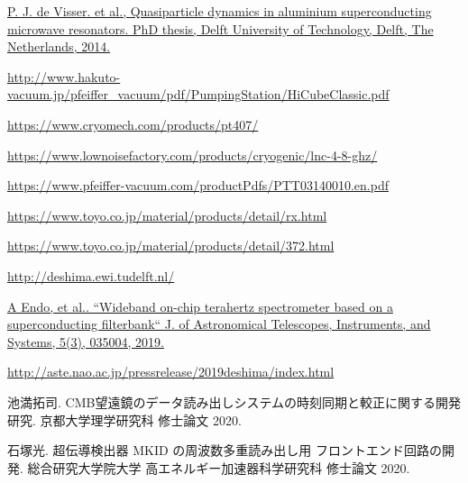 \begin{thebibliography}{99}
\href{https://doi.org/10.4233/uuid:eae4c9fc-f90d-4c12-a878-8428ee4adb4c}{
P. J. de Visser. et al., Quasiparticle dynamics in aluminium superconducting microwave resonators. PhD thesis, Delft University of Technology, Delft, The Netherlands, 2014. 
}


\href{http://www.hakuto-vacuum.jp/pfeiffer\_vacuum/pdf/PumpingStation/HiCubeClassic.pdf}{
http://www.hakuto-vacuum.jp/pfeiffer\_vacuum/pdf/PumpingStation/HiCubeClassic.pdf}

\href{https://www.cryomech.com/products/pt407/}{
https://www.cryomech.com/products/pt407/}

\href{https://www.lownoisefactory.com/products/cryogenic/lnc-4-8-ghz/}{
https://www.lownoisefactory.com/products/cryogenic/lnc-4-8-ghz/}

\href{https://www.pfeiffer-vacuum.com/productPdfs/PTT03140010.en.pdf}{
https://www.pfeiffer-vacuum.com/productPdfs/PTT03140010.en.pdf  
}

\href{https://www.toyo.co.jp/material/products/detail/rx.html}{
https://www.toyo.co.jp/material/products/detail/rx.html
}

\href{https://www.toyo.co.jp/material/products/detail/372.html}{
https://www.toyo.co.jp/material/products/detail/372.html
}

\href{http://deshima.ewi.tudelft.nl/}{
  http://deshima.ewi.tudelft.nl/
}

\href{https://www.spiedigitallibrary.org/journals/Journal-of-Astronomical-Telescopes-Instruments-and-Systems/volume-5/issue-03/035004/Wideband-on-chip-terahertz-spectrometer-based-on-a-superconducting-filterbank/10.1117/1.JATIS.5.3.035004.full}{
A Endo, et al.. “Wideband on-chip terahertz spectrometer based on a superconducting filterbank“ J. of Astronomical Telescopes, Instruments, and Systems, 5(3), 035004, 2019.
}

\href{http://aste.nao.ac.jp/pressrelease/2019deshima/index.html}{http://aste.nao.ac.jp/pressrelease/2019deshima/index.html}

池満拓司. CMB望遠鏡のデータ読み出しシステムの時刻同期と較正に関する開発研究. 京都大学理学研究科 修士論文 2020.

石塚光. 超伝導検出器 MKID の周波数多重読み出し用 フロントエンド回路の開発. 総合研究大学院大学 高エネルギー加速器科学研究科 修士論文 2020.


\end{thebibliography}
